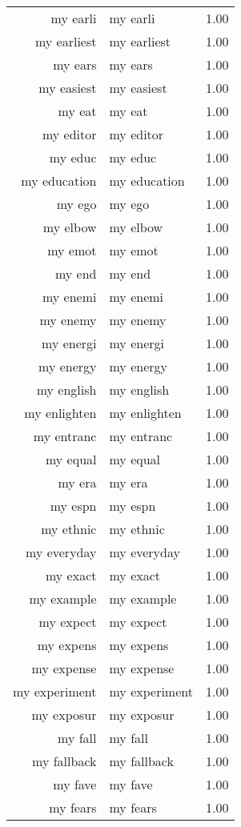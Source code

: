 \begin{table}[ht]
\begin{tabular}{rlr}
  my earli & my earli & 1.00 \\ 
  my earliest & my earliest & 1.00 \\ 
  my ears & my ears & 1.00 \\ 
  my easiest & my easiest & 1.00 \\ 
  my eat & my eat & 1.00 \\ 
  my editor & my editor & 1.00 \\ 
  my educ & my educ & 1.00 \\ 
  my education & my education & 1.00 \\ 
  my ego & my ego & 1.00 \\ 
  my elbow & my elbow & 1.00 \\ 
  my emot & my emot & 1.00 \\ 
  my end & my end & 1.00 \\ 
  my enemi & my enemi & 1.00 \\ 
  my enemy & my enemy & 1.00 \\ 
  my energi & my energi & 1.00 \\ 
  my energy & my energy & 1.00 \\ 
  my english & my english & 1.00 \\ 
  my enlighten & my enlighten & 1.00 \\ 
  my entranc & my entranc & 1.00 \\ 
  my equal & my equal & 1.00 \\ 
  my era & my era & 1.00 \\ 
  my espn & my espn & 1.00 \\ 
  my ethnic & my ethnic & 1.00 \\ 
  my everyday & my everyday & 1.00 \\ 
  my exact & my exact & 1.00 \\ 
  my example & my example & 1.00 \\ 
  my expect & my expect & 1.00 \\ 
  my expens & my expens & 1.00 \\ 
  my expense & my expense & 1.00 \\ 
  my experiment & my experiment & 1.00 \\ 
  my exposur & my exposur & 1.00 \\ 
  my fall & my fall & 1.00 \\ 
  my fallback & my fallback & 1.00 \\ 
  my fave & my fave & 1.00 \\ 
  my fears & my fears & 1.00 \\ 

\end{tabular}
\end{table}
